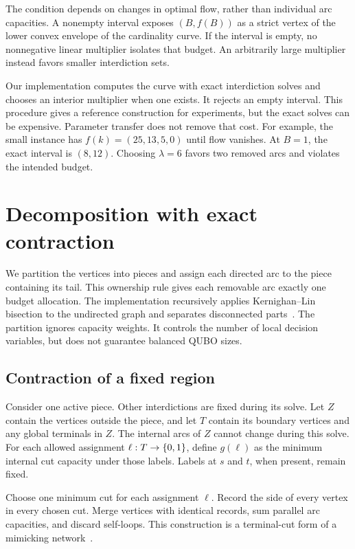 \documentclass[review,onefignum,onetabnum]{siamart171218}
\begin{document}
The condition depends on changes in optimal flow, rather than individual arc capacities.
A nonempty interval exposes $(B,f(B))$ as a strict vertex of the lower convex envelope of the cardinality curve.
If the interval is empty, no nonnegative linear multiplier isolates that budget.
An arbitrarily large multiplier instead favors smaller interdiction sets.

Our implementation computes the curve with exact interdiction solves and chooses an interior multiplier when one exists.
It rejects an empty interval.
This procedure gives a reference construction for experiments, but the exact solves can be expensive.
Parameter transfer does not remove that cost.
For example, the small instance  has $f(k)=(25,13,5,0)$ until flow vanishes.
At $B=1$, the exact interval is $(8,12)$.
Choosing $\lambda=6$ favors two removed arcs and violates the intended budget.

\section{Decomposition with exact contraction}\label{sec:decomposition}
We partition the vertices into pieces and assign each directed arc to the piece containing its tail.
This ownership rule gives each removable arc exactly one budget allocation.
The implementation recursively applies Kernighan--Lin bisection to the undirected graph and separates disconnected parts~\cite{kernighan1970}.
The partition ignores capacity weights.
It controls the number of local decision variables, but does not guarantee balanced QUBO sizes.

\subsection{Contraction of a fixed region}
Consider one active piece.
Other interdictions are fixed during its solve.
Let $Z$ contain the vertices outside the piece, and let $T$ contain its boundary vertices and any global terminals in $Z$.
The internal arcs of $Z$ cannot change during this solve.
For each allowed assignment $\ell:T\to\{0,1\}$, define $g(\ell)$ as the minimum internal cut capacity under those labels.
Labels at $s$ and $t$, when present, remain fixed.

Choose one minimum cut for each assignment $\ell$.
Record the side of every vertex in every chosen cut.
Merge vertices with identical records, sum parallel arc capacities, and discard self-loops.
This construction is a terminal-cut form of a mimicking network~\cite{hagerup1998}.
\end{document}
